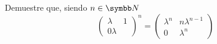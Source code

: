 \item Demuestre que, siendo \(n \in \realN\)
    \[
        \begin{pmatrix}
            \lambda & 1 \\
            0 \lambda
        \end{pmatrix} ^ {n}
        =
        \begin{pmatrix}
            \lambda^{n} & n\lambda^{n - 1} \\
            0 & \lambda^{n}
        \end{pmatrix}
    \]
